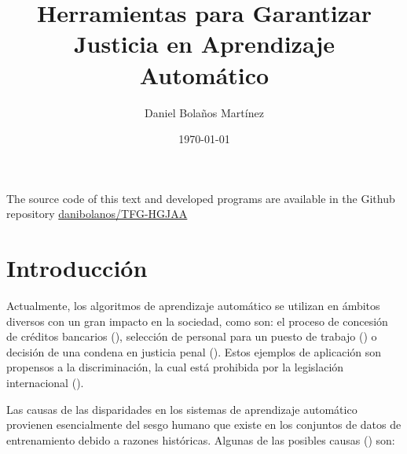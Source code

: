 \documentclass[oneside,openright,titlepage,numbers=noenddot,openany,headinclude,footinclude=true,
cleardoublepage=empty,abstractoff,BCOR=5mm,paper=a4,fontsize=12pt,main=spanish]{scrreprt}
\author{Daniel Bolaños Martínez}
\date{\today}
\title{Herramientas para Garantizar \\Justicia en Aprendizaje Automático}
\begin{document}
\maketitle



\newpage
\vspace*{\fill}
\doclicenseThis
The source code of this text and developed programs are available in the Github repository \href{https://github.com/danibolanos/TFG-HGJAA.git}{danibolanos/TFG-HGJAA}









\tableofcontents


\chapter{Introducción}

Actualmente, los algoritmos de aprendizaje automático se utilizan en ámbitos diversos con un gran impacto en la sociedad, como son: el proceso de concesión de créditos bancarios (\cite{prestamo2018}), selección de personal para un puesto de trabajo (\cite{contratar2015}) o decisión de una condena en justicia penal (\cite{condena2016}). Estos ejemplos de aplicación son propensos a la discriminación, la cual está prohibida por la legislación internacional (\cite{ley1964}).

Las causas de las disparidades en los sistemas de aprendizaje automático provienen esencialmente del sesgo humano que existe en los conjuntos de datos de entrenamiento debido a razones históricas. Algunas de las posibles causas (\cite{bigdata2016}) son:
\end{document}
